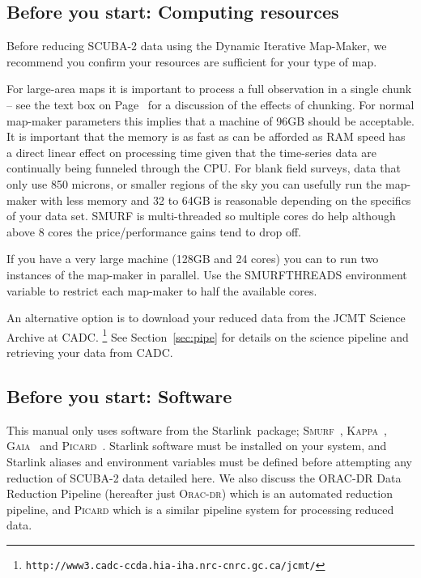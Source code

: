 \documentclass[twoside,11pt]{article}
\newcommand{\htmladdnormallink}[2]{#1}
\newcommand{\htmlref}[2]{#1}
\newcommand{\latex}[1]{#1}
\newcommand{\latexhtml}[2]{#1}
\newcommand{\xref}[3]{#1}
\newcommand{\xlabel}[1]{}
\renewcommand{\_}{\texttt{\symbol{95}}}
\newcommand{\starlink}{\htmladdnormallink{Starlink}{http://starlink.jach.hawaii.edu}}
\newcommand{\gaia}{\xref{\textsc{Gaia}}{sun214}{}}
\newcommand{\Kappa}{\xref{\textsc{Kappa}}{sun95}{}}
\newcommand{\oracdr}{\htmladdnormallink{\textsc{Orac-dr}}{http://www.oracdr.org/oracdr}}
\newcommand{\picard}{\xref{\textsc{Picard}}{sun265}{}}
\newcommand{\smurf}{\xref{\textsc{Smurf}}{sun258}{}}
\newcommand{\cref}[3]{\latexhtml{#1~\ref{#2}}{\htmlref{#3}{#2}}}
\begin{document}
\subsection{\xlabel{computing}Before you start: Computing resources}

Before reducing SCUBA-2 data using the Dynamic Iterative Map-Maker, we
recommend you confirm your resources are sufficient for your type of
map.

For large-area maps it is important to process a full observation in a
single chunk -- see the text box on
\latexhtml{Page~\pageref{page:text}}{\htmlref{What to look
for}{box:chunk}} for a
discussion of the effects of chunking. For normal map-maker parameters
this implies that a machine of 96GB should be acceptable. It is
important that the memory is as fast as can be afforded as RAM speed
has a direct linear effect on processing time given that the
time-series data are continually being funneled through the CPU.  For
blank field surveys, data that only use 850 microns, or smaller
regions of the sky you can usefully run the map-maker with less memory
and 32 to 64GB is reasonable depending on the specifics of your data
set. SMURF is multi-threaded so multiple cores do help although above
8 cores the price/performance gains tend to drop off.

If you have a very large machine (128GB and 24 cores) you can to run
two instances of the map-maker in parallel. Use the SMURF\_THREADS
environment variable to restrict each map-maker to half the available
cores.

An alternative option is to download your reduced data from the
\htmladdnormallink{JCMT Science Archive at
CADC.}{http://www3.cadc-ccda.hia-iha.nrc-cnrc.gc.ca/jcmt/}
\latex{\footnote{\texttt{http://www3.cadc-ccda.hia-iha.nrc-cnrc.gc.ca/jcmt/}}}
See \cref{Section}{sec:pipe}{SCUBA-2 Pipeline} for details on the
science pipeline and retrieving your data from CADC.

\subsection{\xlabel{software}Before you start: Software}

This manual only uses software from the \starlink\ package;
\smurf\ \cite{smurf}, \Kappa\ \cite{kappa}, \gaia\ \cite{gaia} and
\picard\ \cite{picard}.
Starlink software must be installed on your system, and Starlink aliases
and environment variables must be defined before attempting any
reduction of SCUBA-2 data detailed here. We also discuss the ORAC-DR
Data Reduction Pipeline\cite{oracdr} (hereafter just \oracdr) which is
an automated reduction pipeline, and \textsc{Picard} which is a similar
pipeline system for processing reduced data.
\end{document}
